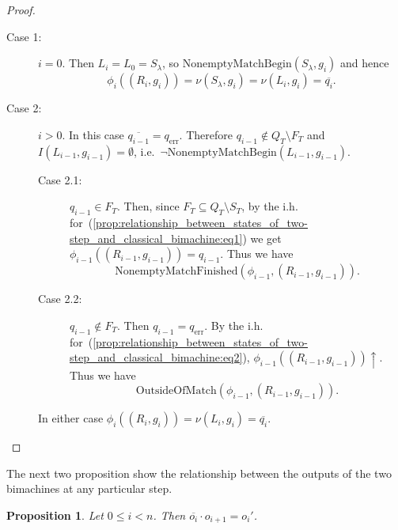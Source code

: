 \documentclass{article}
\newtheorem{proposition}[definition]{Proposition}
\begin{document}
\begin{proof}
\begin{description}
				\begin{description}
				\item[Case 1:] $i=0$.
					Then $L_i = L_0 = S_\lambda$, so $\mathrm{NonemptyMatchBegin}(S_\lambda, g_i)$ and hence
					\[ \phi_i((R_i, g_i)) = \nu(S_\lambda, g_i) = \nu(L_i, g_i) = \overline{q_i}. \]
				\item[Case 2:] $i>0$.
					In this case $\overline{q_{i-1}} = q_\mathrm{err}$. Therefore $q_{i-1}\notin Q_T\setminus F_T$ and $I(L_{i-1}, g_{i-1}) = \emptyset$, i.e.\ $\lnot\mathrm{NonemptyMatchBegin}(L_{i-1}, g_{i-1})$.
					\begin{description}
					\item[Case 2.1:] $q_{i-1}\in F_T$.
						Then, since $F_T\subseteq Q_T\setminus S_T$, by the i.h. for~(\ref{prop:relationship_between_states_of_two-step_and_classical_bimachine:eq1}) we get $\phi_{i-1}((R_{i-1}, g_{i-1})) = q_{i-1}$.
						Thus we have
						\[ \mathrm{NonemptyMatchFinished}(\phi_{i-1}, (R_{i-1}, g_{i-1})). \]
					\item[Case 2.2:] $q_{i-1}\notin F_T$. Then $q_{i-1} = q_\mathrm{err}$. By the i.h. for~(\ref{prop:relationship_between_states_of_two-step_and_classical_bimachine:eq2}), $\phi_{i-1}((R_{i-1}, g_{i-1}))\uparrow$. Thus we have
					\[ \mathrm{OutsideOfMatch}(\phi_{i-1}, (R_{i-1}, g_{i-1})). \]
					\end{description}
					In either case $\phi_i((R_i, g_i)) = \nu(L_i, g_i) = \overline{q_i}$.
				\end{description}
		\end{description}
	\end{proof}
	The next two proposition show the relationship between the outputs of the two bimachines at any particular step.
	\begin{proposition} \label{prop:relationship_between_outputs_of_two-step_and_classical_bimachine}
		Let $0\le i < n$. Then \( \overline{o_i}\cdot o_{i+1} = o_i' \).
	\end{proposition}
\end{document}

